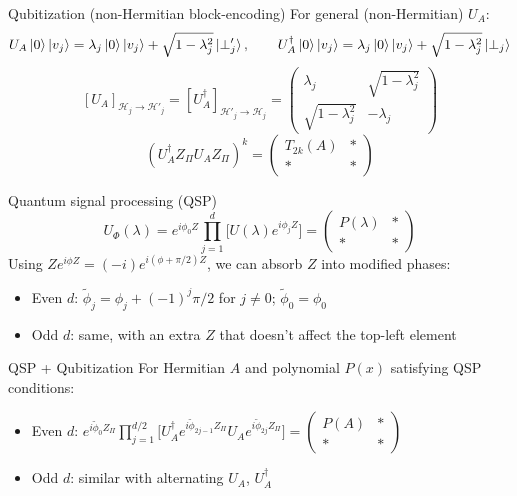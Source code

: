 \documentclass[aspectratio=169]{beamer}
\begin{document}
\begin{frame}{Qubitization (non-Hermitian block-encoding)}
For general (non-Hermitian) $U_A$:
$$U_A\ket{0}\ket{v_j}=\lambda_j\ket{0}\ket{v_j}+\sqrt{1-\lambda_j^2}\ket{\perp'_j},\qquad
U_A^\dagger\ket{0}\ket{v_j}=\lambda_j\ket{0}\ket{v_j}+\sqrt{1-\lambda_j^2}\ket{\perp_j}$$
$$[U_A]_{\mathcal{H}_j\to\mathcal{H}'_j}=[U_A^\dagger]_{\mathcal{H}'_j\to\mathcal{H}_j}=\begin{pmatrix}\lambda_j&\sqrt{1-\lambda_j^2}\\\sqrt{1-\lambda_j^2}&-\lambda_j\end{pmatrix}$$
$$(U_A^\dagger Z_\Pi U_A Z_\Pi)^k=\begin{pmatrix}T_{2k}(A)&*\\*&*\end{pmatrix}$$
\end{frame}

\begin{frame}{Quantum signal processing (QSP)}
$$U_\Phi(\lambda)=e^{i\phi_0 Z}\prod_{j=1}^d\bigl[U(\lambda)e^{i\phi_j Z}\bigr]=\begin{pmatrix}P(\lambda)&*\\*&*\end{pmatrix}$$
Using $Ze^{i\phi Z}=(-i)e^{i(\phi+\pi/2)Z}$, we can absorb $Z$ into modified phases:
\begin{itemize}
\item Even $d$: $\tilde\phi_j=\phi_j+(-1)^j\pi/2$ for $j\ne0$; $\tilde\phi_0=\phi_0$
\item Odd $d$: same, with an extra $Z$ that doesn't affect the top-left element
\end{itemize}
\end{frame}

\begin{frame}{QSP + Qubitization}
For Hermitian $A$ and polynomial $P(x)$ satisfying QSP conditions:
\begin{itemize}
\item Even $d$: $e^{i\tilde\phi_0 Z_\Pi}\prod_{j=1}^{d/2}\bigl[U_A^\dagger e^{i\tilde\phi_{2j-1}Z_\Pi}U_A e^{i\tilde\phi_{2j}Z_\Pi}\bigr]=\begin{pmatrix}P(A)&*\\*&*\end{pmatrix}$
\item Odd $d$: similar with alternating $U_A$, $U_A^\dagger$
\end{itemize}
\end{frame}
\end{document}
